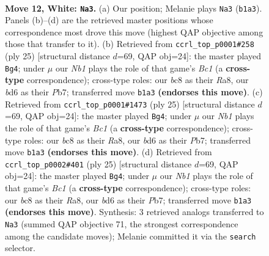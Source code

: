 \documentclass[11pt]{article}
\begin{document}
\clearpage

\begin{figure}[p]\centering
\begin{subfigure}{0.46\textwidth}\centering
\resizebox{\linewidth}{!}{%
\newchessgame
\chessboard[
  setfen={rnb1r1k1/pp3ppp/3b1q2/3p4/3p4/3B1N2/PPP2PPP/RN1Q1RK1 w - - 0 12},
  showmover=false,
  pgfstyle=straightmove, color=movearrow, markmove={b1-a3}
]}
\caption{}
\end{subfigure}\hfill
\begin{subfigure}{0.46\textwidth}\centering
\resizebox{\linewidth}{!}{%
\newchessgame
\chessboard[
  setfen={r1bq1rk1/1p3ppp/3b1n2/pN1p4/8/1P2PB2/P1Q2PPP/R1B1K2R b KQ - 0 13},
  showmover=false,
  pgfstyle=straightmove, color=movearrow, markmove={c8-g4}
]}
\caption{}
\end{subfigure}
\\[4pt]
\begin{subfigure}{0.46\textwidth}\centering
\resizebox{\linewidth}{!}{%
\newchessgame
\chessboard[
  setfen={r1bq1rk1/1p3ppp/3b1n2/pN1p4/8/1P2PB2/P1Q2PPP/R1B1K2R b KQ - 0 13},
  showmover=false,
  pgfstyle=straightmove, color=movearrow, markmove={c8-g4}
]}
\caption{}
\end{subfigure}\hfill
\begin{subfigure}{0.46\textwidth}\centering
\resizebox{\linewidth}{!}{%
\newchessgame
\chessboard[
  setfen={r1bq1rk1/1p3ppp/3b1n2/pN1p4/8/1P2PB2/P1Q2PPP/R1B1K2R b KQ - 0 13},
  showmover=false,
  pgfstyle=straightmove, color=movearrow, markmove={c8-g4}
]}
\caption{}
\end{subfigure}
\caption{\textbf{Move 12, White: \texttt{Na3}.} (a) Our position; Melanie plays \texttt{Na3} (\texttt{b1a3}). Panels (b)--(d) are the retrieved master positions whose correspondence most drove this move (highest QAP objective among those that transfer to it). (b) Retrieved from \texttt{ccrl\_top\_p0001\#258} (ply 25) [structural distance $d$=69, QAP obj=24]: the master played \texttt{Bg4}; under $\mu$ our \emph{Nb1} plays the role of that game's \emph{Bc1} (a \textbf{cross-type} correspondence); cross-type roles: our \emph{b}c8 as their \emph{R}a8, our \emph{b}d6 as their \emph{P}b7; transferred move \texttt{b1a3} \textbf{(endorses this move)}. (c) Retrieved from \texttt{ccrl\_top\_p0001\#1473} (ply 25) [structural distance $d$=69, QAP obj=24]: the master played \texttt{Bg4}; under $\mu$ our \emph{Nb1} plays the role of that game's \emph{Bc1} (a \textbf{cross-type} correspondence); cross-type roles: our \emph{b}c8 as their \emph{R}a8, our \emph{b}d6 as their \emph{P}b7; transferred move \texttt{b1a3} \textbf{(endorses this move)}. (d) Retrieved from \texttt{ccrl\_top\_p0002\#401} (ply 25) [structural distance $d$=69, QAP obj=24]: the master played \texttt{Bg4}; under $\mu$ our \emph{Nb1} plays the role of that game's \emph{Bc1} (a \textbf{cross-type} correspondence); cross-type roles: our \emph{b}c8 as their \emph{R}a8, our \emph{b}d6 as their \emph{P}b7; transferred move \texttt{b1a3} \textbf{(endorses this move)}. Synthesis: 3 retrieved analogs transferred to \texttt{Na3} (summed QAP objective 71, the strongest correspondence among the candidate moves); Melanie committed it via the \texttt{search} selector.}
\label{fig:thought-m22}
\end{figure}
\end{document}
